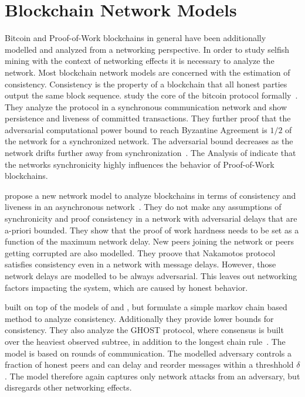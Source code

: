 \section{Blockchain Network Models}
Bitcoin and Proof-of-Work blockchains in general have been additionally modelled and analyzed from a networking perspective. In order to study selfish mining with the context of networking effects it is necessary to analyze the network. 
Most blockchain network models are concerned with the estimation of consistency. Consistency is the property of a blockchain that all honest parties output the same block sequence.
\citeauthor{garay2015bitcoin} study the core of the bitcoin protocol formally~\cite{garay2015bitcoin}. They analyze the protocol in a synchronous communication network and show persistence and liveness of committed transactions. They further proof that the adversarial computational power bound to reach Byzantine Agreement is $1/2$ of the network for a synchronized network. The adversarial bound decreases as the network drifts further away from synchronization~\cite{garay2015bitcoin}.
The Analysis of \citeauthor{garay2015bitcoin} indicate that the networks synchronicity highly influences the behavior of Proof-of-Work blockchains.

\citeauthor{pass2017analysis} propose a new network model to analyze blockchains in terms of consistency and liveness in an asynchronous network~\cite{pass2017analysis}. They do not make any assumptions of synchronicity and proof consistency in a network with adversarial delays that are a-priori bounded. They show that the proof of work hardness needs to be set as a function of the maximum network delay. New peers joining the network or peers getting corrupted are also modelled. They proove that Nakamotos protocol satisfies consistency even in a network with message delays. However, those network delays are modelled to be always adversarial. This leaves out networking factors impacting the system, which are caused by honest behavior.

\citeauthor{kiffer2018better} built on top of the models of \citeauthor{garay2015bitcoin} and \citeauthor{pass2017analysis}, but formulate a simple markov chain based method to analyze consistency. Additionally they provide lower bounds for consistency. They also analyze the GHOST protocol, where consensus is built over the heaviest observed subtree, in addition to the longest chain rule~\cite{kiffer2018better}. The model is based on rounds of communication. The modelled adversary controls a fraction of honest peers and  can delay and reorder messages within a threshhold $\delta$. The model therefore again captures only network attacks from an adversary, but disregards other networking effects.

